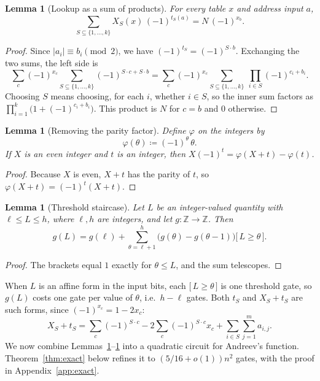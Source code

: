\documentclass[11pt,letterpaper]{article}
\newtheorem{lemma}[theorem]{Lemma}
\theoremstyle{remark}
\newcommand{\ind}[1]{\bigl[\,#1\,\bigr]}
\begin{document}
\begin{lemma}[Lookup as a sum of products]\label{lem:lookup}
For every table $x$ and address input $a$,
\[
\sum_{S\subseteq\{1,\dots,k\}}X_S(x)\,(-1)^{t_S(a)}=N\,(-1)^{x_b}.
\]
\end{lemma}
\begin{proof}
Since $|a_i|\equiv b_i\pmod2$, we have $(-1)^{t_S}=(-1)^{S\cdot b}$.
Exchanging the two sums, the left side is
\[
\sum_c(-1)^{x_c}\sum_{S\subseteq\{1,\dots,k\}}(-1)^{S\cdot c+S\cdot b}
=\sum_c(-1)^{x_c}\sum_{S\subseteq\{1,\dots,k\}}\ \prod_{i\in S}(-1)^{c_i+b_i}.
\]
Choosing $S$ means choosing, for each $i$, whether $i\in S$, so the inner sum
factors as $\prod_{i=1}^k\bigl(1+(-1)^{c_i+b_i}\bigr)$. This product is $N$ for
$c=b$ and $0$ otherwise.
\end{proof}

\begin{lemma}[Removing the parity factor]\label{lem:parity}
Define $\varphi$ on the integers by
\[
\varphi(\theta)\coloneqq(-1)^\theta\,\theta .
\]
If $X$ is an even integer and $t$ is an integer, then
$X(-1)^t=\varphi(X+t)-\varphi(t)$.
\end{lemma}
\begin{proof}
Because $X$ is even, $X+t$ has the parity of $t$, so $\varphi(X+t)=(-1)^t(X+t)$.
\end{proof}

\begin{lemma}[Threshold staircase]\label{lem:ladder}
Let $L$ be an integer-valued quantity with $\ell\le L\le h$, where
$\ell,h$ are integers, and let $g:\mathbb Z\to\mathbb Z$. Then
\[
g(L)=g(\ell)+\sum_{\theta=\ell+1}^{h}\bigl(g(\theta)-g(\theta-1)\bigr)\ind{L\ge\theta}.
\]
\end{lemma}
\begin{proof}
The brackets equal $1$ exactly for $\theta\le L$, and the sum telescopes.
\end{proof}

When $L$ is an affine form in the input bits, each $\ind{L\ge\theta}$ is one
threshold gate, so $g(L)$ costs one gate per value of $\theta$, i.e.\ $h-\ell$
gates. Both $t_S$ and $X_S+t_S$ are such forms, since
$(-1)^{x_c}=1-2x_c$:
\begin{equation}\label{eq:form}
X_S+t_S=\sum_c(-1)^{S\cdot c}-2\sum_c(-1)^{S\cdot c}x_c+\sum_{i\in S}\sum_{j=1}^m a_{i,j}.
\end{equation}
We now combine Lemmas~\ref{lem:lookup}--\ref{lem:ladder} into a quadratic
circuit for Andreev's function. Theorem~\ref{thm:exact} below refines it to
$(5/16+o(1))n^2$ gates, with the proof in Appendix~\ref{app:exact}.
\end{document}
